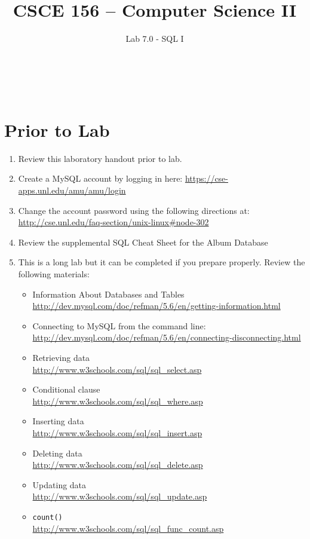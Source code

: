 \documentclass[12pt]{scrartcl}
\title{CSCE 156 -- Computer Science II}
\subtitle{Lab 7.0 - SQL I}
\author{~}
\date{~}
\begin{document}
\maketitle

\section*{Prior to Lab}

\begin{enumerate}
  \item Review this laboratory handout prior to lab.
  \item Create a MySQL account by logging in here: \url{https://cse-apps.unl.edu/amu/amu/login}
  \item Change the account password using the following directions at: 
  	\url{http://cse.unl.edu/faq-section/unix-linux#node-302}
  \item Review the supplemental SQL Cheat Sheet for the Album Database
  \item This is a long lab but it can be completed if you prepare 
	properly.  Review the following materials:
  \begin{itemize}
    \item Information About Databases and Tables \\
    \url{http://dev.mysql.com/doc/refman/5.6/en/getting-information.html}
    \item Connecting to MySQL from the command line: \\ 
    \url{http://dev.mysql.com/doc/refman/5.6/en/connecting-disconnecting.html}
    \item Retrieving data\\ \url{http://www.w3schools.com/sql/sql_select.asp}
    \item Conditional clause	\\ \url{http://www.w3schools.com/sql/sql_where.asp} 
    \item Inserting data	\\ \url{http://www.w3schools.com/sql/sql_insert.asp} 
    \item Deleting data	\\ 
    \url{http://www.w3schools.com/sql/sql_delete.asp} 
    \item Updating data	\\ 
    \url{http://www.w3schools.com/sql/sql_update.asp} 
    \item \texttt{count()}	\\ 
    \url{http://www.w3schools.com/sql/sql_func_count.asp}

\end{itemize}
\end{enumerate}
\end{document}
